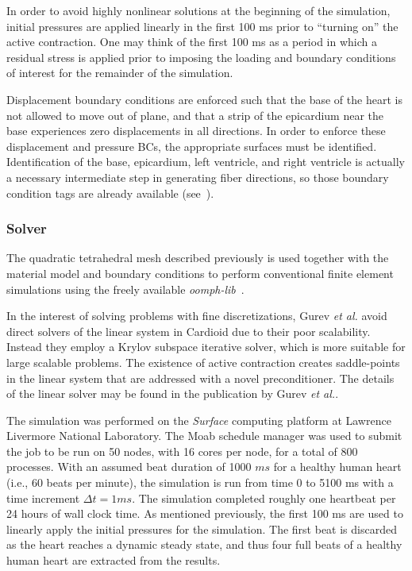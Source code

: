 In order to avoid highly nonlinear solutions at the beginning of the simulation, initial pressures are applied linearly in the first 100 ms prior to ``turning on'' the active contraction. One may think of the first 100 ms as a period in which a residual stress is applied prior to imposing the loading and boundary conditions of interest for the remainder of the simulation.

Displacement boundary conditions are enforced such that the base of the heart is not allowed to move out of plane, and that a strip of the epicardium near the base experiences zero displacements in all directions. In order to enforce these displacement and pressure BCs, the appropriate surfaces must be identified. Identification of the base, epicardium, left ventricle, and right ventricle is actually a necessary intermediate step in generating fiber directions, so those boundary condition tags are already available (see~).

\subsubsection{Solver}
\label{Solver}

The quadratic tetrahedral mesh described previously is used together with the material model and boundary conditions to perform conventional finite element simulations using the freely available \textit{oomph-lib}~\cite{oomph}. 

In the interest of solving problems with fine discretizations, Gurev \textit{et al.} avoid direct solvers of the linear system in Cardioid due to their poor scalability. Instead they employ a Krylov subspace iterative solver, which is more suitable for large scalable problems. The existence of active contraction creates saddle-points in the linear system that are addressed with a novel preconditioner. The details of the linear solver may be found in the publication by Gurev \textit{et al.}.

The simulation was performed on the \textit{Surface} computing platform at Lawrence Livermore National Laboratory. The Moab schedule manager was used to submit the job to be run on 50 nodes, with 16 cores per node, for a total of 800 processes. With an assumed beat duration of 1000 $ms$ for a healthy human heart (i.e., 60 beats per minute), the simulation is run from time 0 to 5100 ms with a time increment $\Delta t = 1 ms$. The simulation completed roughly one heartbeat per 24 hours of wall clock time. As mentioned previously, the first 100 ms are used to linearly apply the initial pressures for the simulation. The first beat is discarded as the heart reaches a dynamic steady state, and thus four full beats of a healthy human heart are extracted from the results.

